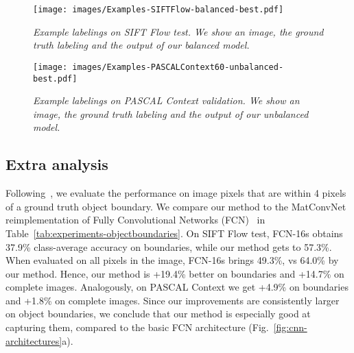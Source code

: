 \begin{figure}
\begin{minipage}{\linewidth}
\centering
\texttt{[image: images/Examples-SIFTFlow-balanced-best.pdf]}
\caption{
\textit{
Example labelings on SIFT Flow test.
We show an image, the ground truth labeling and the output of our balanced model.
}
}
\label{fig:examples-siftflow-balanced}
\end{minipage}

\begin{minipage}{\linewidth}
\centering
\texttt{[image: images/Examples-PASCALContext60-unbalanced-best.pdf]}
\caption{
\textit{
Example labelings on PASCAL Context validation.
We show an image, the ground truth labeling and the output of our unbalanced model.
}
}
\label{fig:examples-pascalcontext}
\end{minipage}
\end{figure}

\subsection{Extra analysis}
\label{sec:extra-analysis}

Following~\cite{kohli09ijcv,Krahenbuhl11nips},
we evaluate the performance on image pixels that are within 4 pixels of a ground truth object boundary.
We compare our method to the MatConvNet~\cite{vedaldi15mm} reimplementation
of Fully Convolutional Networks (FCN)~\cite{long15cvpr} in Table~\ref{tab:experiments-objectboundaries}.
On SIFT Flow test, FCN-16s obtains 37.9\% class-average accuracy on boundaries, while our method gets to 57.3\%.
When evaluated on all pixels in the image, FCN-16s brings 49.3\%, vs 64.0\% by our method.
Hence, our method is +19.4\% better on boundaries and +14.7\% on complete images.
Analogously, on PASCAL Context we get +4.9\% on boundaries and +1.8\% on complete images.
Since our improvements are consistently larger on object boundaries, we conclude that our method is especially good at capturing them, compared to the basic FCN architecture (Fig.~\ref{fig:cnn-architectures}a).

